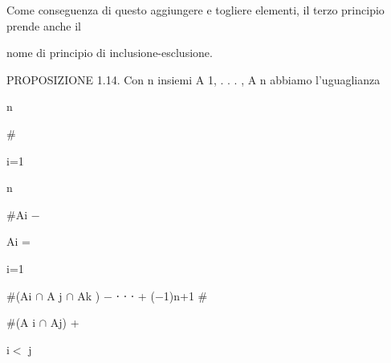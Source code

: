 \documentclass[a4paper,portrait,12pt]{article}
\begin{document}
\begin{flushleft}
Come conseguenza di questo aggiungere e togliere elementi, il terzo principio prende anche il
\end{flushleft}


\begin{flushleft}
nome di principio di inclusione-esclusione.
\end{flushleft}


\begin{flushleft}
PROPOSIZIONE 1.14. Con n insiemi A 1, . . . , A n abbiamo l'uguaglianza
\end{flushleft}


\begin{flushleft}
n
\end{flushleft}





\#


\begin{flushleft}
i=1
\end{flushleft}





\begin{flushleft}
n
\end{flushleft}





\begin{flushleft}
\#Ai $-$
\end{flushleft}





\begin{flushleft}
Ai =
\end{flushleft}


\begin{flushleft}
i=1
\end{flushleft}





\begin{flushleft}
\#(Ai $\cap$ A j $\cap$ Ak ) $-$ ⋅ ⋅ ⋅ + ($-$1)n+1 \#
\end{flushleft}





\begin{flushleft}
\#(A i $\cap$ Aj) +
\end{flushleft}


\begin{flushleft}
i$<$ j
\end{flushleft}
\end{document}
